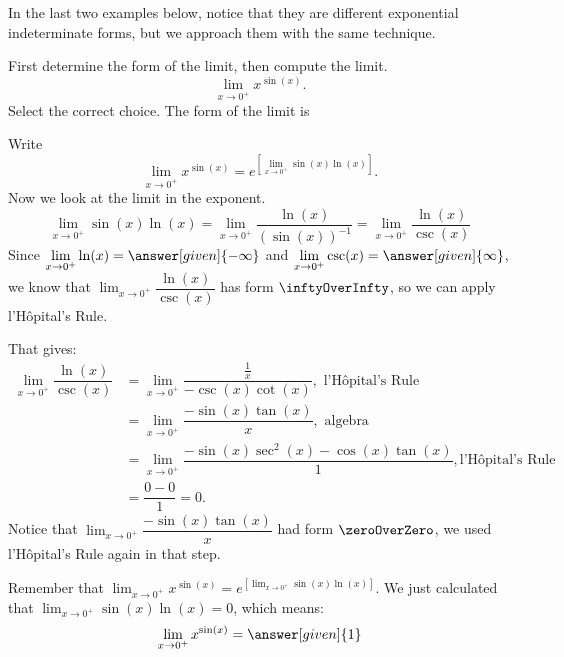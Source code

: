 \documentclass{ximera}
\begin{document}
In the last two examples below, notice that they are different exponential indeterminate forms, but we approach them with the same
technique.
\begin{example}
	First determine the form of the limit, then compute the limit.
	\[ \lim_{x\to 0^+} x ^{\sin(x)}. \]
	 Select the correct choice. The form of the limit is
	 \begin{multipleChoice}
		\choice{$\zeroOverZero$}
		 \choice{ \inftyOverInfty}
		 \choice{$\zeroTimesInfty$}
		 \choice{ \inftyMinusInfty}
		  \choice {$\oneToInfty$}
		   \choice{$ \inftyToZero$}
		   \choice[correct]{$\zeroToZero$}
	 \end{multipleChoice}
  
	\begin{explanation}
		Write 
		\[\lim_{x\to 0^+} x^{\sin(x)} = e^{\left[ \lim_{x\to 0^+} \sin(x) \ln(x) \right]}.\]
		Now we look at the limit in the exponent.
		\[ \lim_{x\to 0^+} \sin(x) \ln(x) = \lim_{x\to 0^+} \dfrac{\ln(x)}{(\sin(x))^{-1}}
				=\lim_{x\to 0^+} \dfrac{\ln(x)}{\csc(x)}\]
		Since $\displaystyle \lim_{x\to 0^+} \ln(x) = \answer[given]{-\infty}$ and $\displaystyle \lim_{x\to 0^+}\csc(x) = \answer[given]{\infty}$, we know that
		$\displaystyle \lim_{x\to 0^+} \dfrac{\ln(x)}{\csc(x)}$ has form $\inftyOverInfty$, so we can apply l'H\^{o}pital's Rule.
		
		That gives:
		\begin{align*}
			\lim_{x\to 0^+} \dfrac{\ln(x)}{\csc(x)} &= \lim_{x\to 0^+} \dfrac{ \frac{1}{x} }{-\csc(x)\cot(x)}, \textrm{ l'H\^{o}pital's Rule}\\
				&= \lim_{x\to 0^+} \dfrac{- \sin(x)\tan(x)}{x}, \textrm{ algebra}\\
				&= \lim_{x\to 0^+} \dfrac{-\sin(x)\sec^2(x) - \cos(x)\tan(x)}{1}, \textrm{l'H\^{o}pital's Rule}\\
				&= \dfrac{0 - 0}{1} = 0.
		\end{align*}
		Notice that $\displaystyle \lim_{x\to 0^+} \dfrac{- \sin(x)\tan(x)}{x}$ had form $\zeroOverZero$, we used l'H\^{o}pital's Rule again
		in that step.
		
		Remember that $\displaystyle \lim_{x\to 0^+} x^{\sin(x)} = e^{\left[ \lim_{x\to 0^+} \sin(x) \ln(x) \right]}$. We just calculated that
		$\displaystyle  \lim_{x\to0^+} \sin(x)\ln(x) = 0$, which means:
		\[\lim_{x\to 0^+} x^{\sin(x)} = \answer[given]{1}\]
	\end{explanation}

\end{example}
\end{document}
